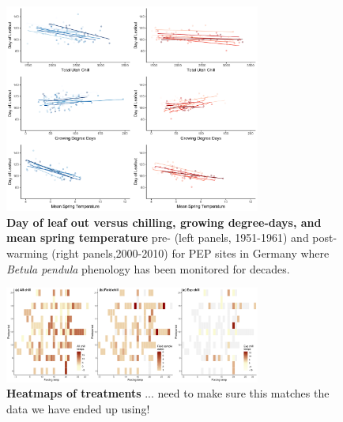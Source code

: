 \documentclass{article}
\begin{document}
\newpage
\begin{figure}[h!]
\centering
\noindent \includegraphics[width=0.75\textwidth]{..//..//analyses/bb_analysis/PEP_climate/figures/betpen_multruns_utahgddmat.pdf}
\caption{\textbf{Day of leaf out versus chilling, growing degree-days, and mean spring temperature} pre- (left panels, 1951-1961) and post- warming (right panels,2000-2010) for PEP sites in Germany where \emph{Betula pendula} phenology has been monitored for decades.}
\label{fig:pep}
\end{figure}

\newpage
\begin{figure}[h!]
\centering
\noindent \includegraphics[width=0.75\textwidth]{..//..//analyses/bb_analysis/figures/studydesign_heat3panel.pdf}
\caption{\textbf{Heatmaps of treatments} ... need to make sure this matches the data we have ended up using!}
\label{fig:treatheatmaps} %
\end{figure}
\end{document}
